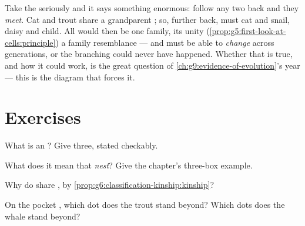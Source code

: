 \begin{remark}\label{rem:g6:classification-kinship:implies}
Take the  seriously and it says something enormous:
follow any two  back and they \emph{meet}. Cat and
trout share a grandparent ; so, further back, must
cat and snail, daisy and child. All  would then
be one family, its unity
(\cref{prop:g5:first-look-at-cells:principle}) a family
resemblance --- and  must be able to \emph{change}
across generations, or the branching could never have
happened. Whether that is true, and how it could work, is
the great question of \cref{ch:g9:evidence-of-evolution}'s
year --- this  is the diagram that forces it.
\end{remark}

\section{Exercises}

\begin{exercise}[$\star$]\label{exo:g6:classification-kinship:1}
What is an ? Give three, stated checkably.
\end{exercise}

\begin{exercise}[$\star$]\label{exo:g6:classification-kinship:2}
What does it mean that  \emph{nest}? Give the
chapter's three-box example.
\end{exercise}

\begin{exercise}[$\star$]\label{exo:g6:classification-kinship:3}
Why do  share , by
\cref{prop:g6:classification-kinship:kinship}?
\end{exercise}

\begin{exercise}[$\star$]\label{exo:g6:classification-kinship:4}
On the pocket , which  dot does the trout
stand beyond? Which dots does the whale stand beyond?
\end{exercise}

